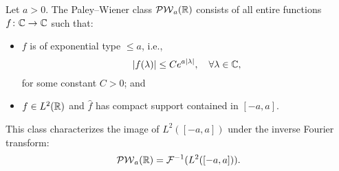 \begin{definition}
\label{def:paley_wiener_class}
Let \( a > 0 \). The Paley–Wiener class \( \mathcal{PW}_{a}(\mathbb{R}) \) consists of all entire functions \( f \colon \mathbb{C} \to \mathbb{C} \) such that:
\begin{itemize}
  \item \( f \) is of exponential type \( \le a \), i.e.,
  \[
  |f(\lambda)| \le C e^{a |\lambda|}, \quad \forall \lambda \in \mathbb{C},
  \]
  for some constant \( C > 0 \); and
  \item \( f \in L^2(\mathbb{R}) \) and \( \widehat{f} \) has compact support contained in \( [-a, a] \).
\end{itemize}

\medskip
\noindent
This class characterizes the image of \( L^2([-a, a]) \) under the inverse Fourier transform:
\[
\mathcal{PW}_{a}(\mathbb{R}) = \mathcal{F}^{-1}(L^2([-a, a])).
\]
\end{definition}
